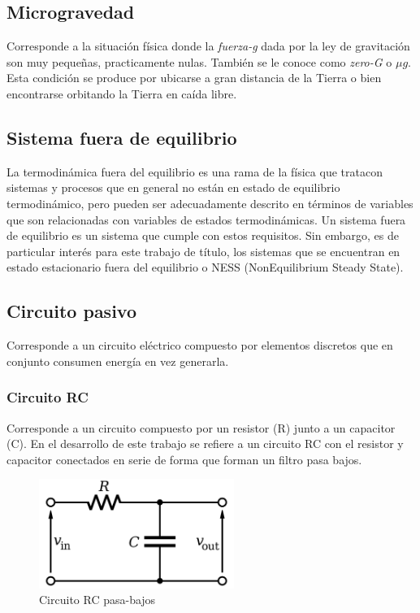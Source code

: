 \documentclass[11pt,letterpaper]{article}
\begin{document}
\subsection{Microgravedad}
Corresponde a la situación física donde la \textit{ fuerza-g} dada por la ley de gravitación son muy pequeñas, practicamente nulas. Tambi\'en se le conoce como \textit{zero-G} o $\mu g$.
Esta condición se produce por ubicarse a gran distancia de la Tierra o bien encontrarse orbitando la Tierra en caída libre.
\subsection{Sistema fuera de equilibrio}
La termodinámica fuera del equilibrio es una rama de la física que tratacon sistemas y procesos que en general no están en estado de equilibrio termodinámico, pero pueden ser adecuadamente descrito en t\'erminos de variables que son relacionadas con variables de estados termodinámicas.
Un sistema fuera de equilibrio es un sistema que cumple con estos requisitos. Sin embargo, es de particular inter\'es para este trabajo de título, los sistemas que se encuentran en estado estacionario fuera del equilibrio o NESS (NonEquilibrium Steady State).

\subsection{Circuito pasivo}
Corresponde a un circuito el\'ectrico compuesto por elementos discretos que en conjunto consumen energía en vez generarla.
\subsubsection{Circuito RC}
Corresponde a un circuito compuesto por un resistor (R) junto a un capacitor (C). En el desarrollo de este trabajo se refiere a un circuito RC con el resistor y capacitor conectados en serie de forma que forman un filtro pasa bajos.
\begin{figure}[ht!]
\centering
\includegraphics[width=180pt]{img/rc.png}
\caption{Circuito RC pasa-bajos}
\label{fig:rc}
\end{figure}
\end{document}
